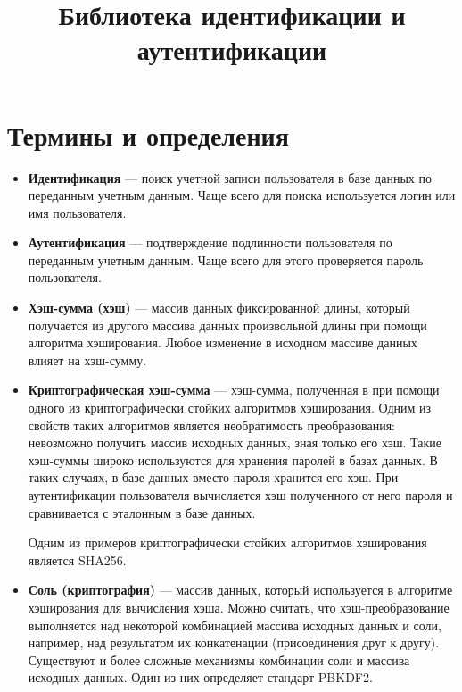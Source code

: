 \documentclass[14pt]{extarticle}
\title{Библиотека идентификации и аутентификации}
\begin{document}
\maketitle

\tableofcontents

\section{Термины и определения}

\begin{itemize}

 \item \textbf{Идентификация} --- поиск учетной записи пользователя в базе
  данных по переданным учетным данным. 
  Чаще всего для поиска используется логин или имя пользователя.

 \item \textbf{Аутентификация} --- подтверждение подлинности пользователя
  по переданным учетным данным.
  Чаще всего для этого проверяется пароль пользователя.

 \item \textbf{Хэш-сумма (хэш)} --- массив данных фиксированной длины, который
  получается из другого массива данных произвольной длины при помощи алгоритма
  хэширования.
  Любое изменение в исходном массиве данных влияет на хэш-сумму.

 \item \textbf{Криптографическая хэш-сумма} --- хэш-сумма, полученная в
  при помощи одного из криптографически стойких алгоритмов хэширования.
  Одним из свойств таких алгоритмов является необратимость преобразования:
  невозможно получить массив исходных данных, зная только его хэш.
  Такие хэш-суммы широко используются для хранения паролей в базах данных.
  В таких случаях, в базе данных вместо пароля хранится его хэш.
  При аутентификации пользователя вычисляется хэш полученного от него пароля
  и сравнивается с эталонным в базе данных.

  Одним из примеров криптографически стойких алгоритмов хэширования является
  SHA256\footnotemark{}.


 \item \textbf{Соль (криптография)} --- массив данных, который используется в
  алгоритме хэширования для вычисления хэша.
  Можно считать, что хэш-преобразование выполняется над некоторой комбинацией
  массива исходных данных и соли, например, над результатом их конкатенации
  (присоединения друг к другу).
  Существуют и более сложные механизмы комбинации соли и массива исходных
  данных.
  Один из них определяет стандарт PBKDF2\footnotemark{}.


\end{itemize}
\end{document}
